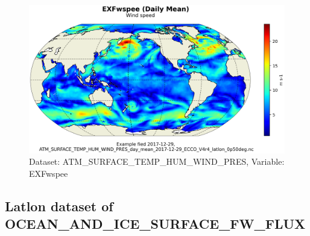 \begin{figure}[H]
\centering
\includegraphics[scale=0.55]{../images/plots/latlon_plots/Atmosphere_Surface_Temperature_Humidity_Wind_and_Pressure/EXFwspee.png}
\caption{Dataset: ATM\_SURFACE\_TEMP\_HUM\_WIND\_PRES, Variable: EXFwspee}
\label{tab:table-ATM_SURFACE_TEMP_HUM_WIND_PRES_EXFwspee-Plot}
\end{figure}
\subsection{Latlon dataset of OCEAN\_AND\_ICE\_SURFACE\_FW\_FLUX}
\newp
